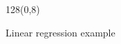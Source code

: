 \documentclass[shownotes]{beamer}
\begin{document}
\begin{frame}
\begin{textblock}{128}(0,8)
\begin{center}
 \large Linear regression example
\end{center}
\end{textblock}
\vspace{0.75cm}



\end{frame}
\end{document}
